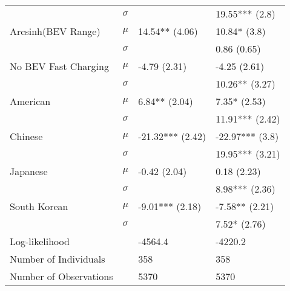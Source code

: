 \begin{tabular}{llll}
                       &  $\sigma$ &                                &                 19.55*** (2.8) \\
    Arcsinh(BEV Range) &     $\mu$ &                 14.54** (4.06) &                   10.84* (3.8) \\
                       &  $\sigma$ &                                &                    0.86 (0.65) \\
  No BEV Fast Charging &     $\mu$ &                   -4.79 (2.31) &                   -4.25 (2.61) \\
                       &  $\sigma$ &                                &                 10.26** (3.27) \\
              American &     $\mu$ &                  6.84** (2.04) &                   7.35* (2.53) \\
                       &  $\sigma$ &                                &                11.91*** (2.42) \\
               Chinese &     $\mu$ &               -21.32*** (2.42) &                -22.97*** (3.8) \\
                       &  $\sigma$ &                                &                19.95*** (3.21) \\
              Japanese &     $\mu$ &                   -0.42 (2.04) &                    0.18 (2.23) \\
                       &  $\sigma$ &                                &                 8.98*** (2.36) \\
          South Korean &     $\mu$ &                -9.01*** (2.18) &                 -7.58** (2.21) \\
                       &  $\sigma$ &                                &                   7.52* (2.76) \\
 \hline Log-likelihood &           &                        -4564.4 &                        -4220.2 \\
 Number of Individuals &           &                            358 &                            358 \\
Number of Observations &           &                           5370 &                           5370 \\
\bottomrule
\end{tabular}
